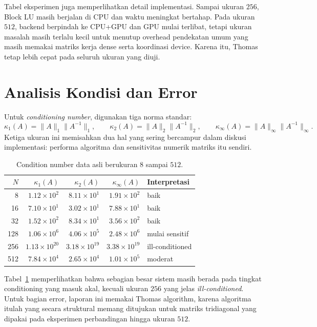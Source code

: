 \documentclass[12pt,a4paper]{article}
\begin{document}
Tabel eksperimen juga memperlihatkan detail implementasi. Sampai ukuran $256$, Block LU masih berjalan di CPU dan waktu meningkat bertahap. Pada ukuran $512$, backend berpindah ke CPU+GPU dan GPU mulai terlibat, tetapi ukuran masalah masih terlalu kecil untuk menutup overhead pendekatan umum yang masih memakai matriks kerja dense serta koordinasi device. Karena itu, Thomas tetap lebih cepat pada seluruh ukuran yang diuji.

\section{Analisis Kondisi dan Error}
Untuk \emph{conditioning number}, digunakan tiga norma standar:
\[
\kappa_1(A)=\|A\|_1\|A^{-1}\|_1,\qquad
\kappa_2(A)=\|A\|_2\|A^{-1}\|_2,\qquad
\kappa_\infty(A)=\|A\|_\infty\|A^{-1}\|_\infty.
\]
Ketiga ukuran ini memisahkan dua hal yang sering bercampur dalam diskusi implementasi: performa algoritma dan sensitivitas numerik matriks itu sendiri.

\begin{table}[h]
\centering
\caption{Condition number data asli berukuran $8$ sampai $512$.}
\label{tab:condition-number}
\begin{tabular}{rrrrl}
\toprule
$N$ & $\kappa_1(A)$ & $\kappa_2(A)$ & $\kappa_\infty(A)$ & Interpretasi \\
\midrule
8   & $1.12\times 10^2$  & $8.11\times 10^1$  & $1.91\times 10^2$  & baik \\
16  & $7.10\times 10^1$  & $3.02\times 10^1$  & $7.88\times 10^1$  & baik \\
32  & $1.52\times 10^2$  & $8.34\times 10^1$  & $3.56\times 10^2$  & baik \\
128 & $1.06\times 10^6$  & $4.06\times 10^5$  & $2.48\times 10^6$  & mulai sensitif \\
256 & $1.13\times 10^{20}$ & $3.18\times 10^{19}$ & $3.38\times 10^{19}$ & ill-conditioned \\
512 & $7.84\times 10^4$  & $2.65\times 10^4$  & $1.01\times 10^5$  & moderat \\
\bottomrule
\end{tabular}
\end{table}

Tabel~\ref{tab:condition-number} memperlihatkan bahwa sebagian besar sistem masih berada pada tingkat conditioning yang masuk akal, kecuali ukuran $256$ yang jelas \emph{ill-conditioned}. Untuk bagian error, laporan ini memakai Thomas algorithm, karena algoritma itulah yang secara struktural memang ditujukan untuk matriks tridiagonal yang dipakai pada eksperimen perbandingan hingga ukuran $512$.
\end{document}
